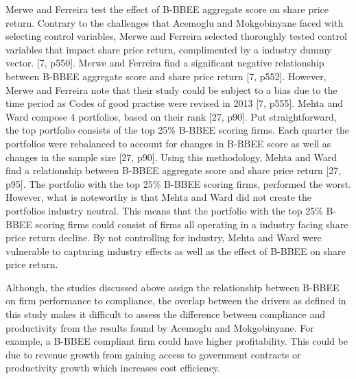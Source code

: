 Merwe and Ferreira test the effect of B-BBEE aggregate score on share price return. Contrary to the challenges that Acemoglu and Mokgobinyane faced with selecting control variables, Merwe and Ferreira selected thoroughly tested control variables that impact share price return, complimented by a industry dummy vector. [7, p550]. Merwe and Ferreira find a significant negative relationship between B-BBEE aggregate score and share price return [7, p552]. However, Merwe and Ferreira note that their study could be subject to a bias due to the time period as Codes of good practise were revised in 2013 [7, p555]. Mehta and Ward compose 4 portfolios, based on their rank [27, p90]. Put straightforward, the top portfolio consists of the top 25\% B-BBEE scoring firms. Each quarter the portfolios were rebalanced to account for changes in B-BBEE score as well as changes in the sample size [27, p90]. Using this methodology, Mehta and Ward find a relationship between B-BBEE aggregate score and share price return [27, p95]. The portfolio with the top 25\% B-BBEE scoring firms, performed the worst. However, what is noteworthy is that Mehta and Ward did not create the portfolios industry neutral. This means that the portfolio with the top 25\% B-BBEE scoring firms could consist of firms all operating in a industry facing share price return decline. By not controlling for industry, Mehta and Ward were vulnerable to capturing industry effects as well as the effect of B-BBEE on share price return.

Although, the studies discussed above assign the relationship between B-BBEE on firm performance to compliance, the overlap between the drivers as defined in this study makes it difficult to assess the difference between compliance and productivity from the results found by Acemoglu and Mokgobinyane. For example, a B-BBEE compliant firm could have higher profitability. This could be due to revenue growth from gaining access to government contracts or productivity growth which increases cost efficiency.
